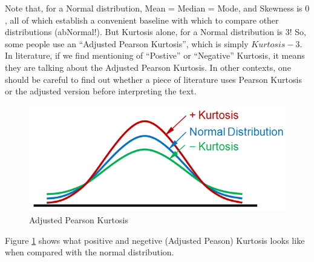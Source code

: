 Note that, for a Normal distribution, Mean = Median = Mode, and Skewness is $0$, all of which establish a convenient baseline with which to compare other distributions (abNormal!). But Kurtosis alone, for a Normal distribution is 3! So, some people use an ``Adjusted Pearson Kurtosis'', which is simply $Kurtosis - 3$. In literature, if we find mentioning of ``Postive'' or ``Negative'' Kurtosis, it means they are talking about the Adjusted Pearson Kurtosis. In other contexts, one should be careful to find out whether a piece of literature uses Pearson Kurtosis or the adjusted version before interpreting the text.
	\begin{figure}
	  \centering
	    \includegraphics[width=\textwidth]{Statistics/kurtosis}
	  \caption{Adjusted Pearson Kurtosis}
	  \label{fig:kurtosis}
	\end{figure}

Figure \ref{fig:kurtosis} shows what positive and negetive (Adjusted Peason) Kurtosis looks like when compared with the normal distribution.  


